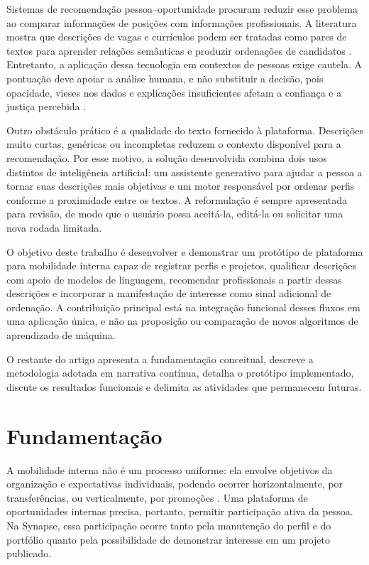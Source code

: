 \documentclass[12pt]{article}
\begin{document}
Sistemas de recomendação pessoa--oportunidade procuram reduzir esse problema ao comparar informações de posições com informações profissionais. A literatura mostra que descrições de vagas e currículos podem ser tratadas como pares de textos para aprender relações semânticas e produzir ordenações de candidatos \cite{bian2019domain}. Entretanto, a aplicação dessa tecnologia em contextos de pessoas exige cautela. A pontuação deve apoiar a análise humana, e não substituir a decisão, pois opacidade, vieses nos dados e explicações insuficientes afetam a confiança e a justiça percebida \cite{tang2025explainable}.

Outro obstáculo prático é a qualidade do texto fornecido à plataforma. Descrições muito curtas, genéricas ou incompletas reduzem o contexto disponível para a recomendação. Por esse motivo, a solução desenvolvida combina dois usos distintos de inteligência artificial: um assistente generativo para ajudar a pessoa a tornar suas descrições mais objetivas e um motor responsável por ordenar perfis conforme a proximidade entre os textos. A reformulação é sempre apresentada para revisão, de modo que o usuário possa aceitá-la, editá-la ou solicitar uma nova rodada limitada.

O objetivo deste trabalho é desenvolver e demonstrar um protótipo de plataforma para mobilidade interna capaz de registrar perfis e projetos, qualificar descrições com apoio de modelos de linguagem, recomendar profissionais a partir dessas descrições e incorporar a manifestação de interesse como sinal adicional de ordenação. A contribuição principal está na integração funcional desses fluxos em uma aplicação única, e não na proposição ou comparação de novos algoritmos de aprendizado de máquina.

O restante do artigo apresenta a fundamentação conceitual, descreve a metodologia adotada em narrativa contínua, detalha o protótipo implementado, discute os resultados funcionais e delimita as atividades que permanecem futuras.

\section{Fundamentação}

A mobilidade interna não é um processo uniforme: ela envolve objetivos da organização e expectativas individuais, podendo ocorrer horizontalmente, por transferências, ou verticalmente, por promoções \cite{ray2024internal}. Uma plataforma de oportunidades internas precisa, portanto, permitir participação ativa da pessoa. Na Synapse, essa participação ocorre tanto pela manutenção do perfil e do portfólio quanto pela possibilidade de demonstrar interesse em um projeto publicado.
\end{document}
